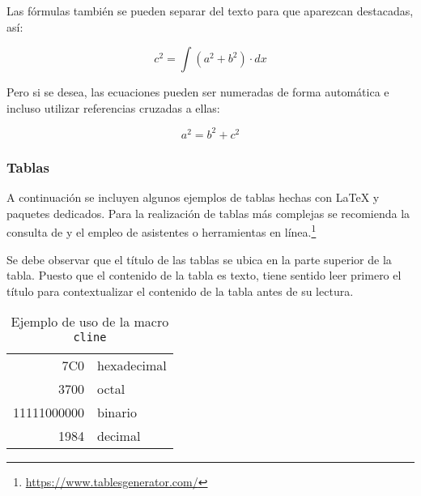 Las fórmulas también se pueden separar del texto para que aparezcan destacadas, así:

\[
c^2  = \int {\left( {a^2  + b^2} \right)}  \cdot dx
\]

Pero si se desea, las ecuaciones pueden ser numeradas de forma automática e incluso utilizar referencias cruzadas a ellas:

\begin{equation} \label{eq:pitagoras}
	a^{2}=b^{2} + c^{2}
\end{equation}





\subsubsection{Tablas}
\label{sec:tablas}
A continuación se incluyen algunos ejemplos de tablas hechas con 
\LaTeX{} y paquetes dedicados. Para la realización de tablas más complejas se recomienda la consulta de \cite{borbon21,overleaf21} y el empleo de asistentes o herramientas en línea.\footnote{\url{https://www.tablesgenerator.com/}}

Se debe observar que el título de las tablas se ubica en la parte superior de la tabla. Puesto que el contenido de la tabla es texto, tiene sentido leer primero el título para contextualizar el contenido de la tabla antes de su lectura.

\begin{table}[hbt]%
	\centering
	\caption{Ejemplo de uso de la macro \texttt{cline}}
	\label{tab:cline}
	\begin{tabular}[t]{|r|l|}
		\hline
		7C0 & hexadecimal \\[1cm] %
		3700 & octal \\ \cline{2-2}
		11111000000 & binario \\
		\hline \hline
		1984 & decimal \\
		\hline
	\end{tabular}
\end{table}


